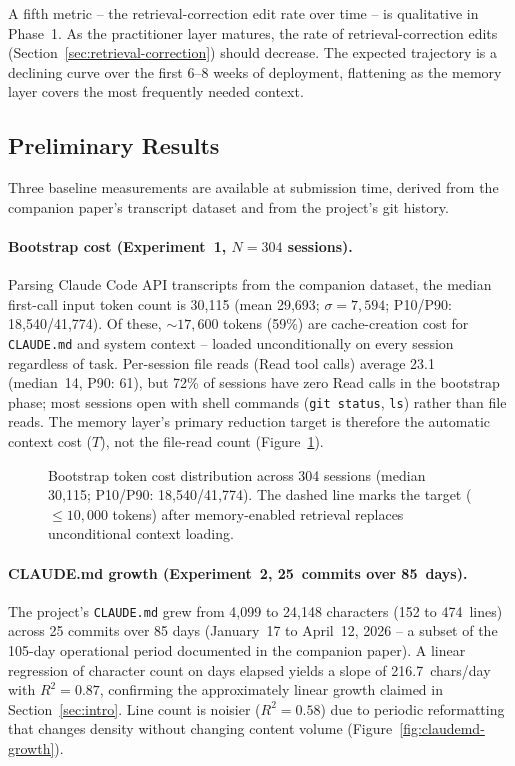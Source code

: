 \documentclass[11pt]{article}
\begin{document}
A fifth metric -- the retrieval-correction edit rate over time -- is qualitative in Phase~1.
As the practitioner layer matures, the rate of retrieval-correction edits (Section~\ref{sec:retrieval-correction}) should decrease.
The expected trajectory is a declining curve over the first 6--8 weeks of deployment, flattening as the memory layer covers the most frequently needed context.

\subsection{Preliminary Results}
\label{sec:preliminary}

Three baseline measurements are available at submission time, derived from the companion paper's transcript dataset and from the project's git history.

\paragraph{Bootstrap cost (Experiment~1, $N{=}304$ sessions).}
Parsing Claude Code API transcripts from the companion dataset, the median first-call input token count is 30{,}115 (mean 29{,}693; $\sigma{=}7{,}594$; P10/P90: 18{,}540/41{,}774).
Of these, ${\sim}17{,}600$ tokens (59\%) are cache-creation cost for \texttt{CLAUDE.md} and system context -- loaded unconditionally on every session regardless of task.
Per-session file reads (Read tool calls) average 23.1 (median~14, P90: 61), but 72\% of sessions have zero Read calls in the bootstrap phase; most sessions open with shell commands (\texttt{git status}, \texttt{ls}) rather than file reads.
The memory layer's primary reduction target is therefore the automatic context cost ($T$), not the file-read count (Figure~\ref{fig:bootstrap-cost}).

\begin{figure}[t]
\centering

\caption{Bootstrap token cost distribution across 304 sessions (median 30{,}115; P10/P90: 18{,}540/41{,}774). The dashed line marks the target (${\leq}10{,}000$ tokens) after memory-enabled retrieval replaces unconditional context loading.}
\label{fig:bootstrap-cost}
\end{figure}

\paragraph{CLAUDE.md growth (Experiment~2, 25~commits over 85~days).}
The project's \texttt{CLAUDE.md} grew from 4{,}099 to 24{,}148 characters (152 to 474~lines) across 25 commits over 85 days (January~17 to April~12, 2026 -- a subset of the 105-day operational period documented in the companion paper).
A linear regression of character count on days elapsed yields a slope of 216.7~chars/day with $R^2 = 0.87$, confirming the approximately linear growth claimed in Section~\ref{sec:intro}.
Line count is noisier ($R^2 = 0.58$) due to periodic reformatting that changes density without changing content volume (Figure~\ref{fig:claudemd-growth}).
\end{document}
